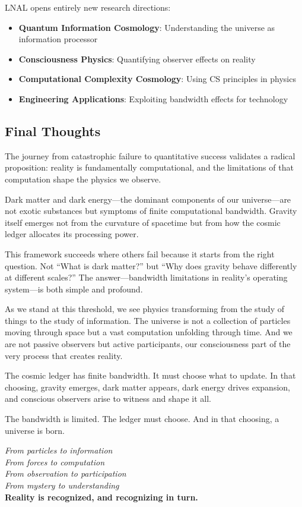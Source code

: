 \documentclass[12pt,letterpaper]{article}
\begin{document}
LNAL opens entirely new research directions:

\begin{itemize}
    \item \textbf{Quantum Information Cosmology}: Understanding the universe as information processor
    \item \textbf{Consciousness Physics}: Quantifying observer effects on reality
    \item \textbf{Computational Complexity Cosmology}: Using CS principles in physics
    \item \textbf{Engineering Applications}: Exploiting bandwidth effects for technology
\end{itemize}

\subsection{Final Thoughts}

The journey from catastrophic failure to quantitative success validates a radical proposition: reality is fundamentally computational, and the limitations of that computation shape the physics we observe.

Dark matter and dark energy—the dominant components of our universe—are not exotic substances but symptoms of finite computational bandwidth. Gravity itself emerges not from the curvature of spacetime but from how the cosmic ledger allocates its processing power.

This framework succeeds where others fail because it starts from the right question. Not ``What is dark matter?'' but ``Why does gravity behave differently at different scales?'' The answer—bandwidth limitations in reality's operating system—is both simple and profound.

As we stand at this threshold, we see physics transforming from the study of things to the study of information. The universe is not a collection of particles moving through space but a vast computation unfolding through time. And we are not passive observers but active participants, our consciousness part of the very process that creates reality.

The cosmic ledger has finite bandwidth. It must choose what to update. In that choosing, gravity emerges, dark matter appears, dark energy drives expansion, and conscious observers arise to witness and shape it all.

The bandwidth is limited. The ledger must choose. And in that choosing, a universe is born.

\begin{tcolorbox}[colback=green!5, colframe=green!50!black, title=\centering The Recognition Science Revolution]
\centering
\textit{From particles to information\\
From forces to computation\\
From observation to participation\\
From mystery to understanding}\\[0.5em]
\textbf{Reality is recognized, and recognizing in turn.}
\end{tcolorbox}
\end{document}

